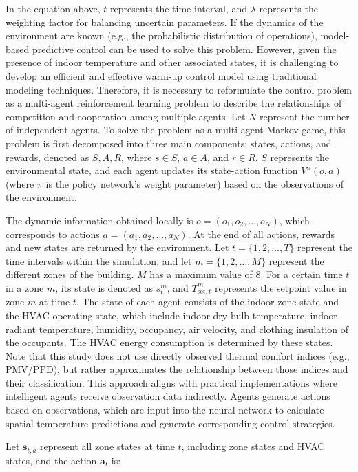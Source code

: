 \documentclass[preprint,12pt]{elsarticle}
\begin{document}
In the equation above, $t$ represents the time interval, and $\lambda$ represents the 
weighting factor for balancing uncertain parameters. If the dynamics of the environment are 
known (e.g., the probabilistic distribution of operations), model-based predictive control can be 
used to solve this problem. However, given the presence of indoor temperature and other associated states, 
it is challenging to develop an efficient and effective warm-up control model using traditional modeling techniques. 
Therefore, it is necessary to reformulate the control problem as a multi-agent reinforcement learning problem 
to describe the relationships of competition and cooperation among multiple agents. Let $N$ represent the 
number of independent agents. To solve the problem as a multi-agent Markov game, this problem is first decomposed 
into three main components: states, actions, and rewards, denoted as $S, A, R$, where $s \in S$, $a \in A$, 
and $r \in R$. $S$ represents the environmental state, and each agent updates its 
state-action function $V^\pi(o, a)$ (where $\pi$ is the policy network's weight parameter) based 
on the observations of the environment.

The dynamic information obtained locally is $o = (o_1, o_2, \ldots, o_N)$, which corresponds to 
actions $a = (a_1, a_2, \ldots, a_N)$. At the end of all actions, rewards and new states are returned by the environment.
Let $t = \{1, 2, \ldots, T\}$ represent the time intervals within the simulation, 
and let $m = \{1, 2, \ldots, M\}$ represent the different zones of the building. $M$ has a 
maximum value of 8. For a certain time $t$ in a zone $m$, its state is denoted as $s_t^m$, 
and $T_{\text{set},t}^m$ represents the setpoint value in zone $m$ at time $t$. The state of 
each agent consists of the indoor zone state and the HVAC operating state, which include indoor dry bulb temperature, 
indoor radiant temperature, humidity, occupancy, air velocity, and clothing insulation of the occupants. 
The HVAC energy consumption is determined by these states. Note that this study does not use directly 
observed thermal comfort indices (e.g., PMV/PPD), but rather approximates the relationship between those 
indices and their classification. This approach aligns with practical implementations where intelligent agents 
receive observation data indirectly. Agents generate actions based on observations, which are input into the 
neural network to calculate spatial temperature predictions and generate corresponding control strategies.

Let $\mathbf{s}_{t,a}$ represent all zone states at time $t$, including zone 
states and HVAC states, and the action $\mathbf{a}_t$ is:
\end{document}
